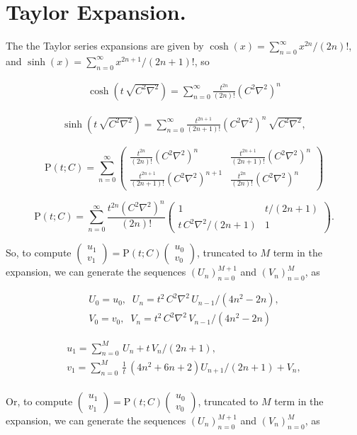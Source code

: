 \documentclass[amsmath,amssymb,floatfix]{revtex4}
\numberwithin{equation}{section}
\newcommand{\twomat}[4]{ \left( \begin{array}{cc} #1 & #2 \\ #3 & #4  \end{array} \right) }
\newcommand{\twovec}[2]{ \left( \begin{array}{c} #1  \\ #2   \end{array} \right) }
\begin{document}
\section{\label{sec:level3}Taylor Expansion.\protect}


The the Taylor series expansions are given by $\cosh{(x)} = \sum_{n=0}^\infty x^{2n}/(2 n)!$, and $\sinh{(x)} = \sum_{n=0}^\infty x^{2n+1}/(2 n+1)!$, so


\begin{eqnarray}
\cosh{( t \, \sqrt{C^2\nabla^2} )} =  \sum_{n=0}^\infty \frac{t^{2n}}{(2n)!} (C^2\nabla^2)^n
\end{eqnarray}

\begin{eqnarray}
\sinh{( t \, \sqrt{C^2\nabla^2} )} =  \sum_{n=0}^\infty \frac{t^{2n+1}}{(2n+1)!} (C^2\nabla^2)^n \, \sqrt{C^2\nabla^2},
\end{eqnarray}


\begin{equation}
	 \textrm{P}(t; C) = \sum_{n=0}^\infty \twomat{\frac{t^{2n}}{(2n)!}(C^2\nabla^2)^n}{\frac{t^{2n+1}}{(2n+1)!}(C^2\nabla^2)^n}{\frac{t^{2n+1}}{(2n+1)!}(C^2\nabla^2)^{n+1}}{\frac{t^{2n}}{(2n)!}(C^2\nabla^2)^n}
\end{equation}
	 
\begin{equation}
	 \textrm{P}(t; C) = \sum_{n=0}^\infty \frac{t^{2n}(C^2\nabla^2)^n}{(2n)!}\twomat{1}{t/(2n+1)}{t \, C^2\nabla^2/(2n+1)}{1}.
\end{equation}

So, to compute $\twovec{u_1}{v_1} = \textrm{P}(t; C) \twovec{u_0}{v_0}$, truncated to $M$ term in the expansion, we can generate the sequences $(U_n)_{n=0}^{M+1}$ and $(V_n)_{n=0}^{M}$, as

\begin{eqnarray}
	 U_0 = u_0, \; \; U_n = t^2 \, C^2\nabla^2 \, U_{n-1} / {(4n^2-2n)},\\
  	 V_0 = v_0, \; \; V_n = t^2 \, C^2\nabla^2 \, V_{n-1} / {(4n^2-2n)}
\end{eqnarray}

\begin{eqnarray}
	 u_1 = \sum_{n=0}^M \, U_n +  t \, V_n/(2n+1),\\
	 v_1 = \sum_{n=0}^M \, \frac{1}{t} \, (4n^2+6n+2)U_{n+1}/(2n+1) + V_n,\\	 
\end{eqnarray}

Or, to compute $\twovec{u_1}{v_1} = \textrm{P}(t; C) \twovec{u_0}{v_0}$, truncated to $M$ term in the expansion, we can generate the sequences $(U_n)_{n=0}^{M+1}$ and $(V_n)_{n=0}^{M}$, as
\end{document}
